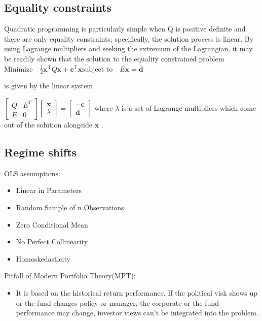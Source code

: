 \documentclass[presentation]{beamer}
\begin{document}
\subsection{Equality constraints}
\label{sec:orgheadline1}
Quadratic programming is particularly simple when Q is positive definite and there are only equality constraints; specifically, the solution process is linear. By using Lagrange multipliers and seeking the extremum of the Lagrangian, it may be readily shown that the solution to the equality constrained problem
\({\text{Minimize}}\quad {\tfrac {1}{2}}\mathbf {x} ^{\mathrm {T} }Q\mathbf {x} +\mathbf {c} ^{\mathrm {T} }\mathbf {x}
{\text{subject to}}\quad E\mathbf {x} =\mathbf {d}\)

is given by the linear system

\({\begin{bmatrix}Q&E^{T}\\E&0\end{bmatrix}}{\begin{bmatrix}\mathbf {x} \\\lambda \end{bmatrix}}={\begin{bmatrix}-\mathbf {c} \\\mathbf {d} \end{bmatrix}}\)
where \({\displaystyle \lambda }\)  is a set of Lagrange multipliers which come out of the solution alongside \({\displaystyle \mathbf {x} }\) .
\subsection{Regime shifts}
\label{sec:orgheadline1}


OLS assumptions:
\begin{itemize}
\item Linear in Parameters
\item Random Sample of n Observations
\item Zero Conditional Mean
\item No Perfect Collinearity
\item Homoskedasticity
\end{itemize}

Pitfall of Modern Portfolio Theory(MPT):
\begin{itemize}
\item It is based on the historical return performance. If the political visk shows up or the fund changes policy or manager, the corporate or the fund performance may change, investor views can't be integrated into the problem.
\end{itemize}
\end{document}
